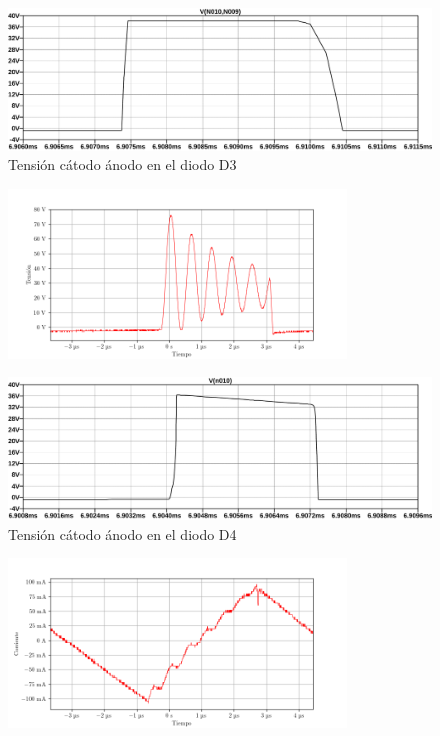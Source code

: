 \begin{figure}[H]
    \centering
    \includegraphics[width=\textwidth]{images/sim/26.pdf}
    \caption{Tensión cátodo ánodo en el diodo D3}
    \label{fig:sim:26}
\end{figure}

\begin{figure}[H]
    \centering
    \includegraphics[width=0.8\textwidth]{images/capturas-osciloscopio/17-11-2022/63.png}
    \caption{}
    \label{fig:osc:63}
\end{figure}

\begin{figure}[H]
    \centering
    \includegraphics[width=\textwidth]{images/sim/27.pdf}
    \caption{Tensión cátodo ánodo en el diodo D4}
    \label{fig:sim:27}
\end{figure}


\begin{figure}[H]
    \centering
    \includegraphics[width=0.8\textwidth]{images/capturas-osciloscopio/17-11-2022/66.png}
    \caption{}
    \label{fig:osc:66}
\end{figure}

